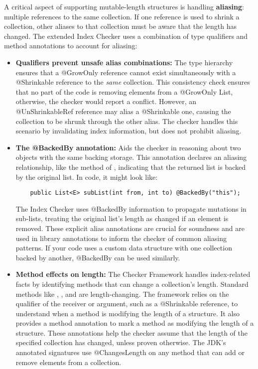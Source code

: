 A critical aspect of supporting mutable-length structures is handling \textbf{aliasing}:
multiple references to the same collection. If one reference is used to shrink a collection,
other aliases to that collection must be aware that the length has changed. The extended Index
Checker uses a combination of type qualifiers and method annotations to account for aliasing:
\begin{itemize}
\item
  \textbf{Qualifiers prevent unsafe alias combinations:}
  The type hierarchy ensures that a @GrowOnly reference cannot exist simultaneously with a @Shrinkable
  reference to the \emph{same} collection. This consistency check ensures that no part of the code is
  removing elements from a @GrowOnly List, otherwise, the checker would report a conflict. However,
  an @UnShrinkableRef reference may alias a @Shrinkable one, causing the collection to be shrunk
  through the other alias. The checker handles this scenario by invalidating index information, but
  does not prohibit aliasing.

\item
  \textbf{The @BackedBy annotation:}
  Aids the checker in reasoning about two objects with the same backing storage. This annotation declares
  an aliasing relationship, like the  method of , indicating that the returned
  list is backed by the original list. In code, it might look like:

\begin{Verbatim}
    public List<E> subList(int from, int to) @BackedBy("this");
\end{Verbatim}

  The Index Checker uses @BackedBy information to propagate mutations in sub-lists, treating
  the original list's length as changed if an element is removed. These explicit alias annotations
  are crucial for soundness and are used in library annotations to inform the checker of
  common aliasing patterns. If your code uses a custom data structure with one collection backed
  by another, @BackedBy can be used similarly.

\item
  \textbf{Method effects on length:}
  The Checker Framework handles index-related facts by identifying methods that can change a
  collection's length. Standard methods like , , and  are
  length-changing. The framework relies on the qualifier of the receiver or argument, such as
  a @Shrinkable reference, to understand when a method is modifying the length of a structure.
  It also provides a method annotation  to mark a method as modifying
  the length of a structure. These annotations help the checker assume that the length of the
  specified collection has changed, unless proven otherwise. The JDK's annotated signatures
  use @ChangesLength on any method that can add or remove elements from a collection.


\end{itemize}
